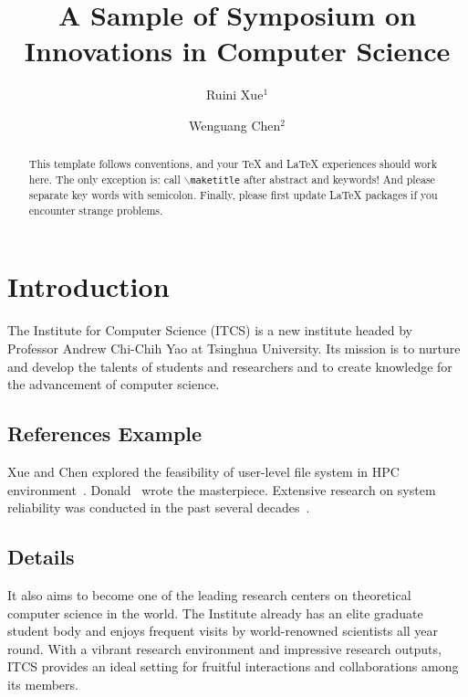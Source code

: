 \documentclass{ics}
\begin{document}
\title{A Sample of Symposium on Innovations in Computer Science}
\author{Ruini Xue$^{1}$ \and Wenguang Chen$^{2}$}
\address{1. Tsinghua University Beijing 100084, 2. Insititute of High Performance Computing Beijing 100084}

\begin{abstract} 
  This template follows \LaTeXe{} conventions, and your \TeX{} and \LaTeX{}
  experiences should work here. The only exception is: call
  \texttt{$\backslash$maketitle} after abstract and keywords! And please
  separate key words with semicolon. Finally, please first update \LaTeX{}
  packages if you encounter strange problems.
\end{abstract}


\maketitle


\section{Introduction}
\label{sec:introduction}
The Institute for Computer Science (ITCS) is a new institute headed by Professor
Andrew Chi-Chih Yao at Tsinghua University. Its mission is to nurture and
develop the talents of students and researchers and to create knowledge for the
advancement of computer science.

\subsection{References Example}
\label{sec:ref-example}
Xue and Chen explored the feasibility of user-level file system in HPC
environment~\cite{xue08}. Donald~ wrote the
masterpiece. Extensive research on system reliability was conducted in the past
several decades~\cite{xue09,Chafik94,MellingerR96,NPB2}.

\subsection{Details}
\label{sec:details}
It also aims to become one of the leading research centers on theoretical
computer science in the world. The Institute already has an elite graduate
student body and enjoys frequent visits by world-renowned scientists all year
round. With a vibrant research environment and impressive research outputs, ITCS
provides an ideal setting for fruitful interactions and collaborations among its
members.
\end{document}
